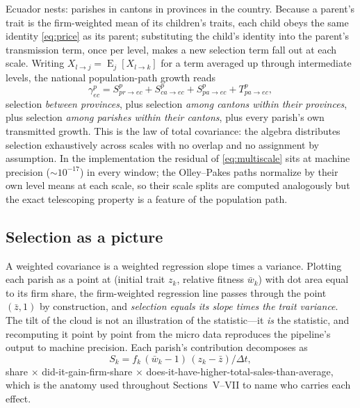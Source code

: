 \documentclass[conference]{IEEEtran}
\newcommand{\E}{\operatorname{E}}
\begin{document}
Ecuador nests: parishes in cantons in provinces in the country. Because a
parent's trait is the firm-weighted mean of its children's traits, each
child obeys the same identity \eqref{eq:price} as its parent; substituting
the child's identity into the parent's transmission term, once per level,
makes a new selection term fall out at each scale. Writing
$X_{l\to j} = \E_j[X_{l\to k}]$ for a term averaged up through
intermediate levels, the national population-path growth reads
\begin{equation}
\gamma^{p}_{ec} =
S^{p}_{pr\to ec} + S^{p}_{ca\to ec} + S^{p}_{pa\to ec} + T^{p}_{pa\to ec},
\label{eq:multiscale}
\end{equation}
selection \textit{between provinces}, plus selection \textit{among cantons
within their provinces}, plus selection \textit{among parishes within their
cantons}, plus every parish's own transmitted growth. This is the law of
total covariance: the algebra distributes selection exhaustively across
scales with no overlap and no assignment by assumption. In the
implementation the residual of \eqref{eq:multiscale} sits at machine
precision ($\sim 10^{-17}$) in every window; the Olley--Pakes paths
normalize by their own level means at each scale, so their scale splits
are computed analogously but the exact telescoping property is a feature
of the population path.

\subsection{Selection as a picture}

A weighted covariance is a weighted regression slope times a variance.
Plotting each parish as a point at (initial trait $z_k$, relative fitness
$\bar w_k$) with dot area equal to its firm share, the firm-weighted
regression line passes through the point $(\bar z, 1)$ by construction,
and \textit{selection equals its slope times the trait variance}. The tilt
of the cloud is not an illustration of the statistic---it \textit{is} the
statistic, and recomputing it point by point from the micro data
reproduces the pipeline's output to machine precision. Each parish's
contribution decomposes as
\begin{equation}
S_k = f_k \,(\bar w_k - 1)\,(z_k - \bar z)/\Delta t ,
\label{eq:contribution}
\end{equation}
share $\times$ did-it-gain-firm-share $\times$
does-it-have-higher-total-sales-than-average,
which is the anatomy used throughout Sections~V--VII to name who carries
each effect.
\end{document}
